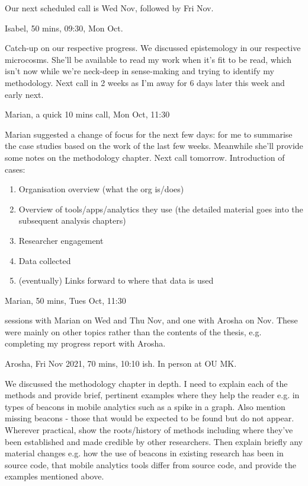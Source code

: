 Our next scheduled call is Wed  Nov, followed by Fri  Nov.

\dotfill
Isabel, 50 mins, 09:30, Mon  Oct.

Catch-up on our respective progress. We discussed epistemology in our respective microcosms. She'll be available to read my work when it's fit to be read, which isn't now while we're neck-deep in sense-making and trying to identify my methodology. Next call in 2 weeks as I'm away for 6 days later this week and early next.

\dotfill
Marian, a quick 10 mins call, Mon  Oct, 11:30

Marian suggested a change of focus for the next few days: for me to summarise the case studies based on the work of the last few weeks. Meanwhile she'll provide some notes on the methodology chapter. Next call tomorrow.
Introduction of cases:
\begin{enumerate}
    \item Organisation overview (what the org is/does)
    \item Overview of tools/apps/analytics they use (the detailed material goes into the subsequent analysis chapters)
    \item Researcher engagement
    \item Data collected
    \item (eventually) Links forward to where that data is used
\end{enumerate}

\dotfill
Marian, 50 mins, Tues  Oct, 11:30

 sessions with Marian on Wed  and Thu  Nov, and one with Arosha on  Nov. These were mainly on other topics rather than the contents of the thesis, e.g. completing my progress report with Arosha.

\dotfill

Arosha, Fri  Nov 2021, 70 mins, 10:10 ish. In person at OU MK.

We discussed the methodology chapter in depth. I need to explain each of the methods and provide brief, pertinent examples where they help the reader e.g. in types of beacons in mobile analytics such as a spike in a graph. Also mention missing beacons - those that would be expected to be found but do not appear. Wherever practical, show the roots/history of methods including where they've been established and made credible by other researchers. Then explain briefly any material changes e.g. how the use of beacons in existing research has been in source code, that mobile analytics tools differ from source code, and provide the examples mentioned above.

